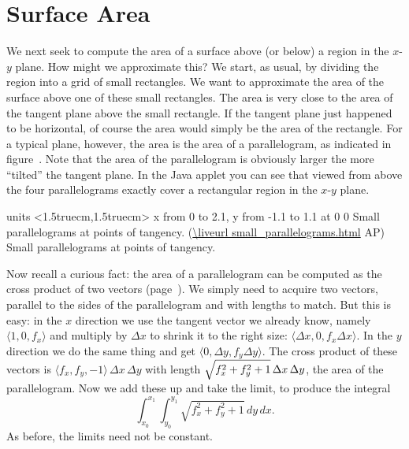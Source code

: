 \section{Surface Area}{}{}

We next seek to compute the area of a surface above (or below) a
region in the $x$-$y$ plane. How might we approximate this? We start,
as usual, by dividing the region into a grid of small rectangles. We
want to approximate the area of the surface above one of these small
rectangles. The area is very close to the area of the tangent plane
above the small rectangle. If the tangent plane just happened to be
horizontal, of course the area would simply be the area of the
rectangle. For a typical plane, however, the area is the area of a
parallelogram, as indicated in figure~.
Note that the area of the parallelogram is obviously larger the more
``tilted'' the tangent plane. In the Java applet you can see that
viewed from above the four parallelograms exactly cover a rectangular
region in the $x$-$y$ plane.

\figure
\texonly
\vbox{\beginpicture
\normalgraphs
\ninepoint
\setcoordinatesystem units <1.5truecm,1.5truecm>
\setplotarea x from 0 to 2.1, y from -1.1 to 1.1
 at 0 0
\endpicture}
\begincaption
Small parallelograms at points of tangency.
(\expandafter\url\expandafter{\liveurl small_parallelograms.html}%
AP\endurl)
\endcaption
\endtexonly
{}
\begincaption
Small parallelograms at points of tangency.
\endcaption
\endfigure

Now recall a curious fact: the area of a
parallelogram can be computed as the cross
product of two vectors (page~). We
simply need to acquire two vectors, parallel to the sides of the
parallelogram and with lengths to match. But this is easy: in the $x$
direction we use the tangent vector we already know, namely $\langle
1,0,f_x\rangle$ and multiply by $\Delta x$ to shrink it to the right
size: $\langle \Delta x,0,f_x\Delta x\rangle$. In the $y$ direction we
do the same thing and get $\langle 0,\Delta y,f_y\Delta y\rangle$. The
cross product of these vectors is $\langle f_x,f_y,-1\rangle\,\Delta
x\,\Delta y$ with length $\displaystyle\sqrt{f_x^2+f_y^2+1}\,\Delta x\,\Delta
y$, the area of the parallelogram. Now we add these up and take the
limit, to produce the integral
$$\int_{x_0}^{x_1}\int_{y_0}^{y_1} \sqrt{f_x^2+f_y^2+1}\,dy\,dx.$$
As before, the limits need not be constant.

